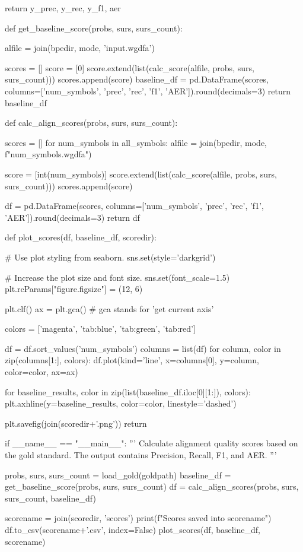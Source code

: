 \begin{python}
  return y_prec, y_rec, y_f1, aer


def get_baseline_score(probs, surs, surs_count):

  alfile = join(bpedir, mode, 'input.wgdfa')

  scores = []
  score = [0]
  score.extend(list(calc_score(alfile, probs, surs, surs_count)))
  scores.append(score)
  baseline_df = pd.DataFrame(scores, columns=['num_symbols', 'prec', 'rec', 'f1', 'AER']).round(decimals=3)
  return baseline_df

def calc_align_scores(probs, surs, surs_count):

  scores = []
  for num_symbols in all_symbols:
    alfile = join(bpedir, mode, f"{num_symbols}.wgdfa")
    
    score = [int(num_symbols)]
    score.extend(list(calc_score(alfile, probs, surs, surs_count)))
    scores.append(score)

  df = pd.DataFrame(scores, columns=['num_symbols', 'prec', 'rec', 'f1', 'AER']).round(decimals=3)
  return df


def plot_scores(df, baseline_df, scoredir):

  # Use plot styling from seaborn.
  sns.set(style='darkgrid')

  # Increase the plot size and font size.
  sns.set(font_scale=1.5)
  plt.rcParams["figure.figsize"] = (12, 6)

  plt.clf()
  ax = plt.gca() # gca stands for 'get current axis'

  colors = ['magenta', 'tab:blue', 'tab:green', 'tab:red']

  df = df.sort_values('num_symbols')
  columns = list(df)
  for column, color in zip(columns[1:], colors):
    df.plot(kind='line', x=columns[0], y=column, color=color, ax=ax)

  for baseline_results, color in zip(list(baseline_df.iloc[0][1:]), colors):
      plt.axhline(y=baseline_results, color=color, linestyle='dashed')

  plt.savefig(join(scoredir+'.png'))
  return


if __name__ == "__main__":
  '''
  Calculate alignment quality scores based on the gold standard.
  The output contains Precision, Recall, F1, and AER.
  '''

  probs, surs, surs_count = load_gold(goldpath)
  baseline_df = get_baseline_score(probs, surs, surs_count)
  df = calc_align_scores(probs, surs, surs_count, baseline_df)

  scorename = join(scoredir, 'scores')
  print(f"Scores saved into {scorename}")
  df.to_csv(scorename+'.csv', index=False)
  plot_scores(df, baseline_df, scorename)

\end{python}

